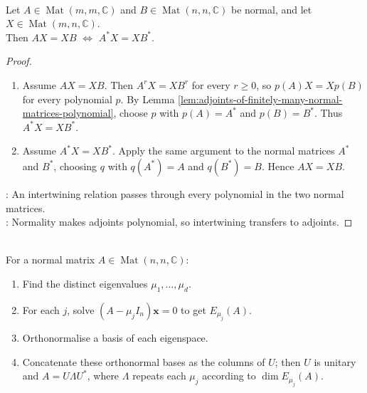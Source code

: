 \begin{theorem} \label{thm:fuglede-putnam-normal-intertwining} \\
Let $A\in\operatorname{Mat}(m,m,\mathbb{C})$ and $B\in\operatorname{Mat}(n,n,\mathbb{C})$ be normal, and let $X\in\operatorname{Mat}(m,n,\mathbb{C})$.\\
Then $AX=XB$ $\Longleftrightarrow$ $A^*X=XB^*$.
\begin{proof}
\begin{enumerate}[label=\roman*.]
\setlength{\itemsep}{0pt}
\item[$(\Rightarrow)$] Assume $AX=XB$. Then $A^rX=XB^r$ for every $r\geq0$, so $p(A)X=Xp(B)$ for every polynomial $p$. By Lemma \ref{lem:adjoints-of-finitely-many-normal-matrices-polynomial}, choose $p$ with $p(A)=A^*$ and $p(B)=B^*$. Thus $A^*X=XB^*$.
\item[$(\Leftarrow)$] Assume $A^*X=XB^*$. Apply the same argument to the normal matrices $A^*$ and $B^*$, choosing $q$ with $q(A^*)=A$ and $q(B^*)=B$. Hence $AX=XB$.
\end{enumerate}
: An intertwining relation passes through every polynomial in the two normal matrices.\\
: Normality makes adjoints polynomial, so intertwining transfers to adjoints.
\end{proof}
\end{theorem}

\begin{method} \label{meth:finding-spectral-decomposition-normal-matrix} \\
For a normal matrix $A\in\operatorname{Mat}(n,n,\mathbb{C})$:
\begin{enumerate}[label=\roman*.]
\setlength{\itemsep}{0pt}
\item Find the distinct eigenvalues $\mu_1,\ldots,\mu_d$.
\item For each $j$, solve $(A-\mu_jI_n)\mathbf{x}=0$ to get $E_{\mu_j}(A)$.
\item Orthonormalise a basis of each eigenspace.
\item Concatenate these orthonormal bases as the columns of $U$; then $U$ is unitary and $A=U\Lambda U^*$, where $\Lambda$ repeats each $\mu_j$ according to $\dim E_{\mu_j}(A)$.
\end{enumerate}
\end{method}

